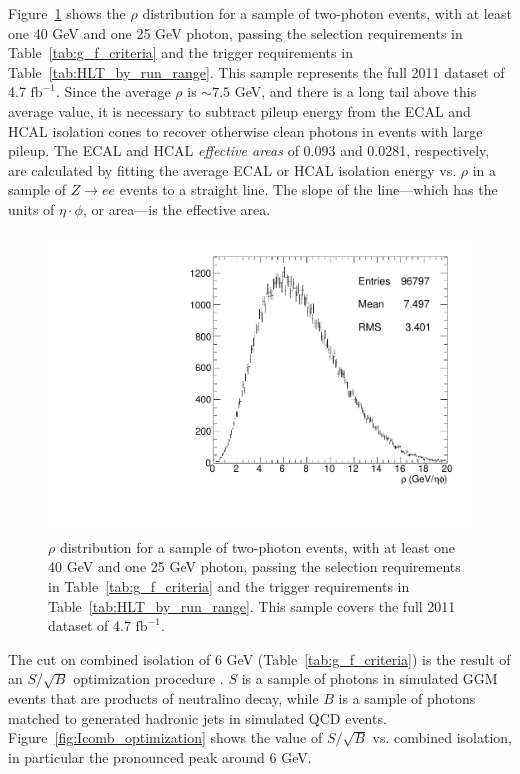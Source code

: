 \documentclass[dissertation.tex]{subfiles}
\begin{document}
Figure~\ref{fig:preselected_rho} shows the $\rho$ distribution for a sample of two-photon events, with at least one 40 GeV and one 25 GeV photon, passing the selection requirements in Table~\ref{tab:g_f_criteria} and the trigger requirements in Table~\ref{tab:HLT_by_run_range}.  This sample represents the full 2011 dataset of 4.7 $\mbox{fb}^{-1}$.  Since the average $\rho$ is $\sim 7.5$ GeV, and there is a long tail above this average value, it is necessary to subtract pileup energy from the ECAL and HCAL isolation cones to recover otherwise clean photons in events with large pileup.  The ECAL and HCAL \textit{effective areas} of 0.093 and 0.0281, respectively, are calculated by fitting the average ECAL or HCAL isolation energy vs. $\rho$ in a sample of $Z\rightarrow ee$ events to a straight line.  The slope of the line---which has the units of $\eta\cdot\phi$, or area---is the effective area.

\begin{figure}
	\centering
	\includegraphics[scale=0.5]{preselected_rho}
	\caption{$\rho$ distribution for a sample of two-photon events, with at least one 40 GeV and one 25 GeV photon, passing the selection requirements in Table~\ref{tab:g_f_criteria} and the trigger requirements in Table~\ref{tab:HLT_by_run_range}.  This sample covers the full 2011 dataset of 4.7 $\mbox{fb}^{-1}$.}
	\label{fig:preselected_rho}
\end{figure}

\marginpar{\textcolor{blue}{New}}The cut on combined isolation of 6 GeV (Table~\ref{tab:g_f_criteria}) is the result of an $S/\sqrt{B}$ optimization procedure \cite{CMS_AN-2011-515}.  $S$ is a sample of photons in simulated GGM events that are products of neutralino decay, while $B$ is a sample of photons matched to generated hadronic jets in simulated QCD events.  Figure~\ref{fig:Icomb_optimization} shows the value of $S/\sqrt{B}$ vs. combined isolation, in particular the pronounced peak around 6 GeV.
\end{document}

